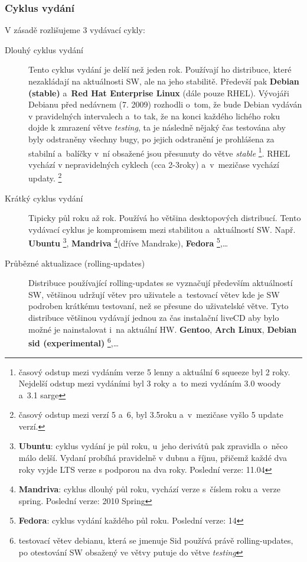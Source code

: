\documentclass[a4paper,12pt]{article}
\renewcommand{\b}[1]{\textbf{#1}} %
\renewcommand{\it}[1]{\textit{#1}}		%
\begin{document}
\subsubsection{Cyklus vydání}
V zásadě rozlišujeme 3 vydávací cykly:
\begin{description}
 \item[Dlouhý cyklus vydání] Tento cyklus vydání je delší než jeden rok. Používají ho distribuce, které nezakládají na aktuálnosti SW, ale na jeho stabilitě. Předevší pak \b{Debian (stable)} a~\b{Red Hat Enterprise Linux} (dále pouze RHEL). Vývojáři Debianu před nedávnem (7. 2009) rozhodli o~tom, že bude Debian vydáván v pravidelných intervalech a~to tak, že na konci každého lichého roku dojde k zmrazení větve \it{testing}, ta je následně nějaký čas testována aby byly odstraněny všechny bugy, po jejich odstranění je prohlášena za stabilní a~balíčky v~ní obsažené jsou přesunuty do větve \it{stable}
\footnote{časový odstup mezi vydáním verze 5 lenny a aktuální 6 squeeze byl 2 roky. Nejdelší odstup mezi vydáními byl 3 roky a~to mezi vydáním 3.0 woody a~3.1 sarge}. RHEL vychází v nepravidelných cyklech (cca 2-3roky) a~v~mezičase vychází updaty. 
\footnote{časový odstup mezi verzí 5 a~6, byl 3.5roku a~v~mezičase vyšlo 5 update verzí.}
 \item[Krátký cyklus vydání] Tipicky půl roku až rok. Používá ho většina desktopových distribucí. Tento vydávací cyklus je kompromisem mezi stabilitou a~aktuálností SW. Např. \b{Ubuntu}
\footnote{\b{Ubuntu}: cyklus vydání je půl roku, u~jeho derivátů pak zpravidla o~něco málo delší. Vydaní probíhá pravidelně v dubnu a říjnu, přičemž každé dva roky vyjde LTS verze s podporou na dva roky. Poslední verze: 11.04}, \b{Mandriva} 
\footnote{\b{Mandriva}: cyklus dlouhý půl roku, vychází verze s~číslem roku a~verze spring. Poslední verze: 2010 Spring}(dříve Mandrake), \b{Fedora} 
\footnote{\b{Fedora}: cyklus vydání každého půl roku. Poslední verze: 14},…
 \item[Průbězné aktualizace (rolling-updates)] Distribuce používající rolling-updates se vyznačují především aktuálností SW, většinou udržují větev pro uživatele a~testovací větev kde je SW podroben krátkému testovaní, než se přesune do uživatelské větve. Tyto distribuce většinou vydávají jednou za čas instalační liveCD aby bylo možné je nainstalovat i~na aktuální HW. \b{Gentoo}, \b{Arch Linux}, \b{Debian sid (experimental)}
\footnote{testovací větev debianu, která se jmenuje Sid používá právě rolling-updates, po otestování SW obsažený ve větvy putuje do větve \it{testing}},…
 \end{description}
\end{document}
